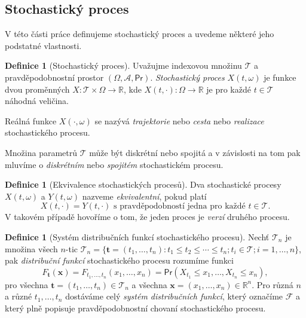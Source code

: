 \documentclass[a4paper,12pt]{report}
\theoremstyle{definition} \newtheorem{definice}[veta]{Definice}
\theoremstyle{remark}
\begin{document}
\subsection{Stochastický proces}
V této části práce definujeme stochastický proces a uvedeme některé jeho podstatné vlastnosti.
\begin{definice}[Stochastický proces]
Uvažujme  indexovou množinu $\mathcal{T}$ a pravděpodobnostní prostor $(\Omega,\mathcal{A}, \mathsf{Pr})$.
\textit{Stochastický proces} $X(t,\omega)$ je funkce dvou proměnných $X:\mathcal{T}\times\Omega\to\mathbb{R}$, kde 
$X(t,\cdot):\Omega\to\mathbb{R}$ je pro každé $t\in\mathcal{T}$ náhodná veličina.

Reálná funkce $X(\cdot,\omega)$ se nazývá \textit{trajektorie} nebo \textit{cesta} nebo \textit{realizace} stochastického procesu. 
\end{definice}
Množina parametrů $\mathcal{T}$ může být diskrétní nebo spojitá a v závislosti na tom pak mluvíme o \textit{diskrétním} nebo \textit{spojitém} stochastickém procesu. 

\begin{definice}[Ekvivalence stochastických procesů]
Dva stochastické procesy $X(t,\omega)$ a $Y(t,\omega)$ nazveme \textit{ekvivalentní}, pokud platí
$$X(t,\cdot)=Y(t,\cdot)\text{ s pravděpodobností jedna pro každé }t\in\mathcal{T}.$$ 
V takovém případě hovoříme o tom, že jeden proces je \textit{verzí} druhého procesu.
\end{definice}

\begin{definice}[Systém distribučních funkcí stochastického procesu]
Nechť $\mathcal{T}_n$ je množina všech $n$-tic $\mathcal{T}_n=\{\boldsymbol{t}=(t_1,\dots,t_n):t_1\leq t_2\leq\cdots\leq t_n; t_i\in\mathcal{T}; i=1,\dots,n\}$,
pak \textit{distribuční funkcí} stochastického procesu rozumíme funkci
$$F_{\boldsymbol{t}}(\boldsymbol{x})=F_{t_1,\dots,t_n}(x_1,\dots,x_n)= \mathsf{Pr}(X_{t_1}\leq x_1,\dots,X_{t_n}\leq x_n),$$
pro všechna $\boldsymbol{t}=(t_1,\dots,t_n)\in \mathcal{T}_n$ a všechna $\boldsymbol{x}=(x_1,\dots,x_n)\in \mathbb{R}^n$.
Pro různá $n$ a různé $t_1,\dots,t_n$ dostáváme celý \textit{systém distribučních funkcí}, který označíme $\mathcal{F}$ a který plně popisuje pravděpodobnostní chovaní stochastického procesu.

\end{definice}
\end{document}
